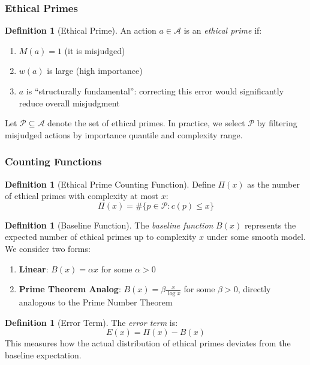 \documentclass[12pt,a4paper]{article}
\theoremstyle{definition}
\newtheorem{definition}[theorem]{Definition}
\theoremstyle{remark}
\begin{document}
\subsubsection{Ethical Primes}

\begin{definition}[Ethical Prime]
An action $a \in \mathcal{A}$ is an \emph{ethical prime} if:
\begin{enumerate}
    \item $M(a) = 1$ (it is misjudged)
    \item $w(a)$ is large (high importance)
    \item $a$ is ``structurally fundamental'': correcting this error would significantly reduce overall misjudgment
\end{enumerate}
\end{definition}

Let $\mathcal{P} \subseteq \mathcal{A}$ denote the set of ethical primes. In practice, we select $\mathcal{P}$ by filtering misjudged actions by importance quantile and complexity range.

\subsubsection{Counting Functions}

\begin{definition}[Ethical Prime Counting Function]
Define $\Pi(x)$ as the number of ethical primes with complexity at most $x$:
\[
\Pi(x) = \#\{p \in \mathcal{P} : c(p) \leq x\}
\]
\end{definition}

\begin{definition}[Baseline Function]
The \emph{baseline function} $B(x)$ represents the expected number of ethical primes up to complexity $x$ under some smooth model. We consider two forms:
\begin{enumerate}
    \item \textbf{Linear}: $B(x) = \alpha x$ for some $\alpha > 0$
    \item \textbf{Prime Theorem Analog}: $B(x) = \beta \frac{x}{\log x}$ for some $\beta > 0$, directly analogous to the Prime Number Theorem
\end{enumerate}
\end{definition}

\begin{definition}[Error Term]
The \emph{error term} is:
\[
E(x) = \Pi(x) - B(x)
\]
This measures how the actual distribution of ethical primes deviates from the baseline expectation.
\end{definition}
\end{document}
